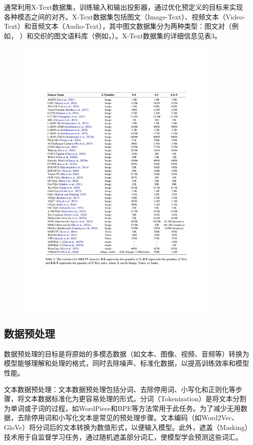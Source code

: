 \documentclass[12pt]{article}
\begin{document}
通常利用X-Text数据集，训练输入和输出投影器，通过优化预定义的目标来实现各种模态之间的对齐。X-Text数据集包括图文（Image-Text）、视频文本（Video-Text）和音频文本（Audio-Text），其中图文数据集分为两种类型：图文对（例如， ）和交织的图文语料库（例如，）。X-Text数据集的详细信息见表3。


\begin{figure}[ht]
    \centering
    \includegraphics[width = 0.9\textwidth, trim = 50 150 50 50]{MMLLM_Dataset.pdf}
   
\end{figure}

\subsection{数据预处理}

数据预处理的目标是将原始的多模态数据（如文本、图像、视频、音频等）转换为模型能够理解和处理的格式，同时去除噪声、标准化数据，以提高训练效率和模型性能。

文本数据预处理：文本数据预处理包括分词、去除停用词、小写化和正则化等步骤，将文本数据标准化为更容易处理的形式。分词（Tokenization）是将文本分割为单词或子词的过程，如WordPiece和BPE等方法常用于此任务。为了减少无用数据，去除停用词和小写化文本是常见的预处理步骤。文本编码（如Word2Vec、GloVe）将分词后的文本转换为数值形式，以便输入模型。此外，遮盖（Masking）技术用于自监督学习任务，通过随机遮盖部分词汇，使模型学会预测这些词汇。
\end{document}
